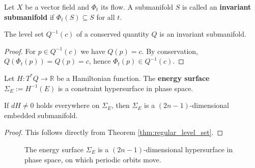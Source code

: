 \begin{definition}\label{def:invariant_submanifold}
Let $X$ be a vector field and $\Phi_t$ its flow. A submanifold $S$ is called an \textbf{invariant submanifold} if $\Phi_t(S) \subseteq S$ for all $t$.
\end{definition}

\begin{proposition}\label{prop:levelset_invariant}
The level set $Q^{-1}(c)$ of a conserved quantity $Q$ is an invariant submanifold.
\end{proposition}

\begin{proof}
For $p \in Q^{-1}(c)$ we have $Q(p) = c$. By conservation, $Q(\Phi_t(p)) = Q(p) = c$, hence $\Phi_t(p) \in Q^{-1}(c)$.
\end{proof}

\begin{definition}\label{def:energy_surface}
Let $H: T^*Q \to \mathbb{R}$ be a Hamiltonian function. The \textbf{energy surface} $\Sigma_E := H^{-1}(E)$ is a constraint hypersurface in phase space.
\end{definition}

\begin{proposition}\label{prop:energy_surface_dimension}
If $dH \neq 0$ holds everywhere on $\Sigma_E$, then $\Sigma_E$ is a $(2n-1)$-dimensional embedded submanifold.
\end{proposition}

\begin{proof}
This follows directly from Theorem \ref{thm:regular_level_set}.
\end{proof}

\begin{figure}[htbp]
\centering
{}
\caption{The energy surface $\Sigma_E$ is a $(2n-1)$-dimensional hypersurface in phase space, on which periodic orbits move.}
\label{fig:energy_surface}
\end{figure}

